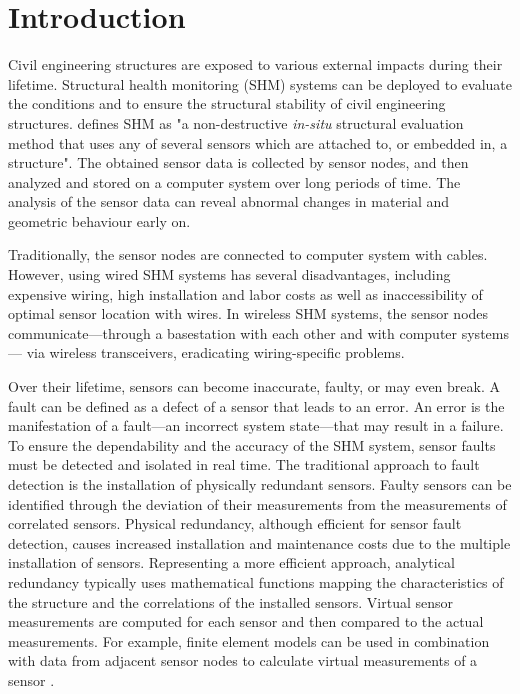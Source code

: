 \documentclass[12pt,a4paper]{scrartcl}
\begin{document}
	
	\section*{Introduction}
	
	Civil engineering structures are exposed to various external impacts during their lifetime. 
	Structural health monitoring (SHM) systems can be deployed to evaluate the conditions and to ensure the structural stability of civil engineering structures.
	\citet{BisbySHM} defines SHM as "a non-destructive \textit{in-situ} structural evaluation method that uses any of several sensors which are attached to, or embedded in, a structure".
	The obtained sensor data is collected by sensor nodes, and then analyzed and stored on a computer system over long periods of time. 
	The analysis of the sensor data can reveal abnormal changes in material and geometric behaviour early on.
	
	Traditionally, the sensor nodes are connected to computer system with cables.
	However, using wired SHM systems has several disadvantages, including expensive wiring, high installation and labor costs as well as inaccessibility of optimal sensor location with wires.
	In wireless SHM systems, the sensor nodes communicate---through a basestation with each other and with computer systems--- via wireless transceivers, eradicating wiring-specific problems.
	
	Over their lifetime, sensors can become inaccurate, faulty, or may even break.
	A fault can be defined as a defect of a sensor that leads to an error. An error is the manifestation of a fault---an incorrect system state---that may result in a failure.
	To ensure the dependability and the accuracy of the SHM system, sensor faults must be detected and isolated in real time. 
	The traditional approach to fault detection is the installation of physically redundant sensors.
	Faulty sensors can be identified through the deviation of their measurements from the measurements of correlated sensors.
	Physical redundancy, although efficient for sensor fault detection, causes increased installation and maintenance costs due to the multiple installation of sensors. 
	Representing a more efficient approach, analytical redundancy typically uses mathematical functions mapping the characteristics of the structure and the correlations of the installed sensors. Virtual sensor measurements are computed for each sensor and then compared to the actual measurements. 
	For example, finite element models can be used in combination with data from adjacent sensor nodes to calculate virtual measurements of a sensor
	\citep{Smarsly2014}.
	
\end{document}
